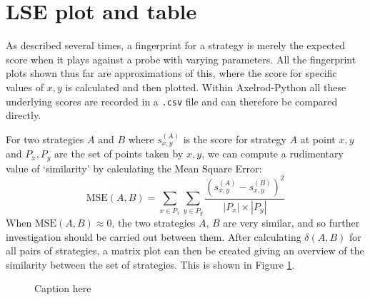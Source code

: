 \section{LSE plot and table}\label{sec:lse}
As described several times, a fingerprint for a strategy is merely the expected score when it plays against a probe with varying parameters.
All the fingerprint plots shown thus far are approximations of this, where the score for specific values of $x, y$ is calculated and then plotted.
Within Axelrod-Python all these underlying scores are recorded in a \texttt{.csv} file and can therefore be compared directly.

For two strategies $A$ and $B$ where $s_{x, y}^{(A)}$ is the score for strategy $A$ at point $x, y$ and $P_x, P_y$ are the set of points taken by $x, y$, we can compute a rudimentary value of `similarity' by calculating the Mean Square Error:
$$
\text{MSE}(A, B) = \sum_{x \in P_x} \sum_{y \in P_y} \frac{(s_{x, y}^{(A)} - s_{x, y}^{(B)})^2}{|P_x|\times|P_y|}
$$
When $\text{MSE}(A, B) \approx 0$, the two strategies $A$, $B$ are very similar, and so further investigation should be carried out between them.
After calculating $\delta(A, B)$ for all pairs of strategies, a matrix plot can then be created giving an overview of the similarity between the set of strategies.
This is shown in Figure \ref{fig:mean_squares}.

\begin{figure}[htbp!]
    \caption{Caption here}
    \label{fig:mean_squares}
\end{figure}
